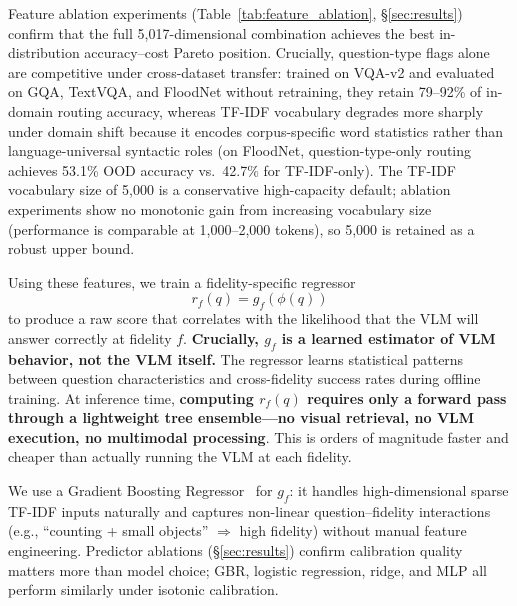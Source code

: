 Feature ablation experiments (Table~\ref{tab:feature_ablation}, \S\ref{sec:results}) confirm that the full 5{,}017-dimensional combination achieves the best in-distribution accuracy--cost Pareto position. Crucially, question-type flags alone are competitive under cross-dataset transfer: trained on VQA-v2 and evaluated on GQA, TextVQA, and FloodNet without retraining, they retain 79--92\% of in-domain routing accuracy, whereas TF-IDF vocabulary degrades more sharply under domain shift because it encodes corpus-specific word statistics rather than language-universal syntactic roles (on FloodNet, question-type-only routing achieves 53.1\% OOD accuracy vs.\ 42.7\% for TF-IDF-only). The TF-IDF vocabulary size of 5{,}000 is a conservative high-capacity default; ablation experiments show no monotonic gain from increasing vocabulary size (performance is comparable at 1{,}000--2{,}000 tokens), so 5{,}000 is retained as a robust upper bound.

Using these features, we train a fidelity-specific regressor
\[
r_f(q) = g_f(\phi(q))
\]
to produce a raw score that correlates with the likelihood that the VLM will answer correctly at fidelity $f$. \textbf{Crucially, $g_f$ is a learned estimator of VLM behavior, not the VLM itself.} The regressor learns statistical patterns between question characteristics and cross-fidelity success rates during offline training. At inference time, \textbf{computing $r_f(q)$ requires only a forward pass through a lightweight tree ensemble---no visual retrieval, no VLM execution, no multimodal processing}. This is orders of magnitude faster and cheaper than actually running the VLM at each fidelity.



We use a Gradient Boosting Regressor~\cite{prettenhofer2014gradient} for $g_f$: it handles high-dimensional sparse TF-IDF inputs naturally and captures non-linear question--fidelity interactions (e.g., ``counting + small objects'' $\Rightarrow$ high fidelity) without manual feature engineering. Predictor ablations (\S\ref{sec:results}) confirm calibration quality matters more than model choice; GBR, logistic regression, ridge, and MLP all perform similarly under isotonic calibration.





